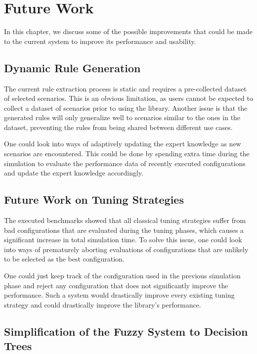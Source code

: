 \chapter{Future Work}
\label{sec:future_work}

In this chapter, we discuss some of the possible improvements that could be made to the current system to improve its performance and usability.

\section{Dynamic Rule Generation}

The current rule extraction process is static and requires a pre-collected dataset of selected scenarios. This is an obvious limitation, as users cannot be expected to collect a dataset of scenarios prior to using the library. Another issue is that the generated rules will only generalize well to scenarios similar to the ones in the dataset, preventing the rules from being shared between different use cases.

One could look into ways of adaptively updating the expert knowledge as new scenarios are encountered. This could be done by spending extra time during the simulation to evaluate the performance data of recently executed configurations and update the expert knowledge accordingly.

\section{Future Work on Tuning Strategies}

The executed benchmarks showed that all classical tuning strategies suffer from bad configurations that are evaluated during the tuning phases, which causes a significant increase in total simulation time. To solve this issue, one could look into ways of prematurely aborting evaluations of configurations that are unlikely to be selected as the best configuration.

One could just keep track of the configuration used in the previous simulation phase and reject any configuration that does not significantly improve the performance.
Such a system would drastically improve every existing tuning strategy and could drastically improve the library's performance.

\section{Simplification of the Fuzzy System to Decision Trees}

